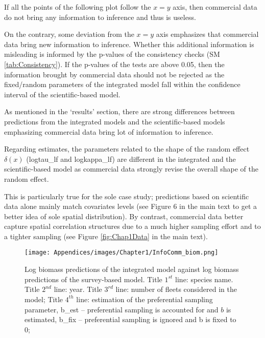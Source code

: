 If all the points of the following plot follow the \(x=y\) axis, then commercial data do not bring any information to inference and thus is useless. 

On the contrary, some deviation from the \(x=y\) axis emphasizes that commercial data bring new information to inference. Whether this additional information is misleading is informed by the p-values of the consistency checks (SM \ref{tab:Consistency}). If the p-values of the tests are above 0.05, then the information brought by commercial data should not be rejected as the fixed/random parameters of the integrated model fall within the confidence interval of the scientific-based model.

As mentioned in the ‘results’ section, there are strong differences between predictions from the integrated models and the scientific-based models emphasizing commercial data bring lot of information to inference.

Regarding estimates, the parameters related to the shape of the random effect \(\delta(x)\) (logtau_lf and logkappa_lf) are different in the integrated and the scientific-based model as commercial data strongly revise the overall shape of the random effect. 

This is particularly true for the sole case study; predictions based on scientific data alone mainly match covariates levels (see Figure 6 in the main text to get a better idea of sole spatial distribution). By contrast, commercial data better capture spatial correlation structures due to a much higher sampling effort and to a tighter sampling (see Figure \ref{fig:Chap1Data} in the main text).

\newpage

\begin{figure}[H]
   \begin{center}
      \texttt{[image: Appendices/images/Chapter1/InfoComm\_biom.png]}
   \end{center}
   \caption[Log biomass predictions of the integrated model against log biomass predictions of the survey-based model.]
   {Log biomass predictions of the integrated model against log biomass predictions of the survey-based model. Title \(1^{st}\) line: species name. Title \(2^{nd}\) line: year. Title \(3^{rd}\) line: number of fleets considered in the model; Title \(4^{th}\) line: estimation of the preferential sampling parameter, b_est – preferential sampling is accounted for and \(b\) is estimated, b_fix – preferential sampling is ignored and b is fixed to 0;}
   \label{fig:InfoCommBiom}
\end{figure}

